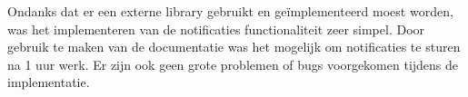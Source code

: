 Ondanks dat er een externe library gebruikt en geïmplementeerd moest worden, was het implementeren van de 
notificaties functionaliteit zeer simpel. Door gebruik te maken van de documentatie was het mogelijk om 
notificaties te sturen na 1 uur werk. Er zijn ook geen grote problemen of bugs voorgekomen tijdens de implementatie.

